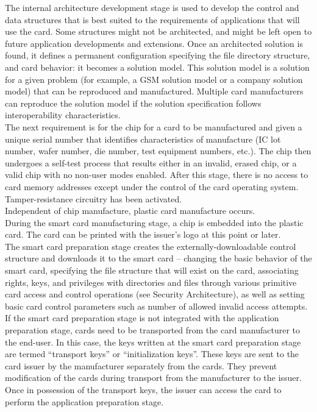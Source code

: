 The internal architecture development stage is used to develop the
control and data structures that is best suited to the requirements of
applications that will use the card. Some structures might not be
architected, and might be left open to future application developments
and extensions. Once an architected solution is found, it defines a
permanent configuration specifying the file directory structure, and
card behavior: it becomes a solution model. This solution model is a
solution for a given problem (for example, a GSM solution model or a
company solution model) that can be reproduced and manufactured.
Multiple card manufacturers can reproduce the solution model if the
solution specification follows interoperability characteristics.\\

The next requirement is for the chip for a card to be manufactured and
given a unique serial number that identifies characteristics of
manufacture (IC lot number, wafer number, die number, test equipment
numbers, etc.). The chip then undergoes a self-test process that
results either in an invalid, erased chip, or a valid chip with no
non-user modes enabled. After this stage, there is no access to card
memory addresses except under the control of the card operating system.
Tamper-resistance circuitry has been activated.\\

Independent of chip manufacture, plastic card manufacture occurs.\\

During the smart card manufacturing stage, a chip is embedded into the
plastic card. The card can be printed with the issuer's logo at this
point or later.\\

The smart card preparation stage creates the externally-downloadable
control structure and downloads it to the smart card -- changing the
basic behavior of the smart card, specifying the file structure that
will exist on the card, associating rights, keys, and privileges with
directories and files through various primitive card access and control
operations (see Security Architecture), as well as setting basic card
control parameters such as number of allowed invalid access attempts.\\

If the smart card preparation stage is not integrated with the
application preparation stage, cards need to be transported from the
card manufacturer to the end-user. In this case, the keys written at
the smart card preparation stage are termed ``transport keys'' or
``initialization keys''. These keys are sent to the card issuer by the
manufacturer separately from the cards. They prevent modification of
the cards during transport from the manufacturer to the issuer. Once in
possession of the transport keys, the issuer can access the card to
perform the application preparation stage.\\

